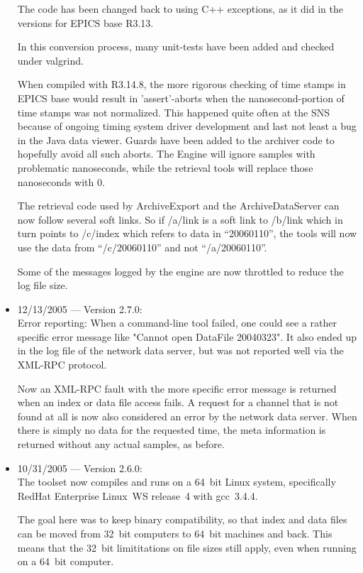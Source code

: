 \begin{itemize}
The code has been changed back to using C++ exceptions, as it did in
the versions for EPICS base R3.13.

In this conversion process, many unit-tests have been added
and checked under valgrind.

When compiled with R3.14.8, the more rigorous checking of time stamps
in EPICS base would result in 'assert'-aborts when the
nanosecond-portion of time stamps was not normalized.
This happened quite often at the SNS because of ongoing timing system driver
development and last not least a bug in the Java data viewer.
Guards have been added to the archiver code to hopefully avoid all
such aborts.
The Engine will ignore samples with problematic nanoseconds,
while the retrieval tools will replace those nanoseconds with 0.

The retrieval code used by ArchiveExport and the ArchiveDataServer can
now follow several soft links. So if /a/link is a soft link to /b/link
which in turn points to /c/index which refers to data in
``20060110'', the tools will now use the data from 
``/c/20060110'' and not ``/a/20060110''.

Some of the messages logged by the engine are now throttled
to reduce the log file size.

\item 12/13/2005 --- Version 2.7.0:\\
Error reporting: When a command-line tool failed,
one could see a rather specific error message
like "Cannot open DataFile 20040323".
It also ended up in the log file of the network
data server, but was not reported well via
the XML-RPC protocol.

Now an XML-RPC fault with the more specific error
message is returned when an index or data file
access fails.
A request for a channel that is not found at all is now
also considered an error by the network data server.
When there is simply no data for the requested time,
the meta information is returned without any
actual samples, as before.

\item 10/31/2005 --- Version 2.6.0:\\
The toolset now compiles and runs on a 64~bit Linux system,
specifically RedHat Enterprise Linux~WS release~4
with gcc~3.4.4.

The goal here was to keep binary compatibility,
so that index and data files can be moved from
32~bit computers to 64~bit machines and back.
This means that the 32~bit limititations on
file sizes still apply, even when running
on a 64~bit computer.


\end{itemize}
